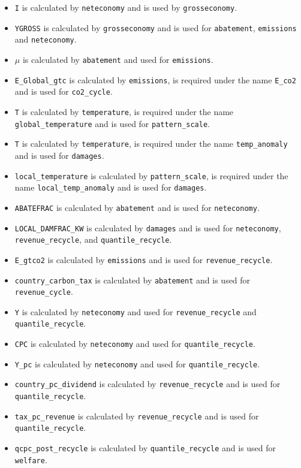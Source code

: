 \documentclass[
]{article}
\providecommand{\tightlist}{%
  \setlength{\itemsep}{0pt}\setlength{\parskip}{0pt}}
\begin{document}
\begin{itemize}
\tightlist
\item
  \texttt{I} is calculated by \texttt{neteconomy} and is used by
  \texttt{grosseconomy}.
\item
  \texttt{YGROSS} is calculated by \texttt{grosseconomy} and is used for
  \texttt{abatement}, \texttt{emissions} and \texttt{neteconomy}.
\item
  \(\mu\) is calculated by \texttt{abatement} and used for
  \texttt{emissions}.
\item
  \texttt{E\_Global\_gtc} is calculated by \texttt{emissions}, is
  required under the name \texttt{E\_co2} and is used for
  \texttt{co2\_cycle}.
\item
  \texttt{T} is calculated by \texttt{temperature}, is required under
  the name \texttt{global\_temperature} and is used for
  \texttt{pattern\_scale}.
\item
  \texttt{T} is calculated by \texttt{temperature}, is required under
  the name \texttt{temp\_anomaly} and is used for \texttt{damages}.
\item
  \texttt{local\_temperature} is calculated by \texttt{pattern\_scale},
  is required under the name \texttt{local\_temp\_anomaly} and is used
  for \texttt{damages}.
\item
  \texttt{ABATEFRAC} is calculated by \texttt{abatement} and is used for
  \texttt{neteconomy}.
\item
  \texttt{LOCAL\_DAMFRAC\_KW} is calculated by \texttt{damages} and is
  used for \texttt{neteconomy}, \texttt{revenue\_recycle}, and
  \texttt{quantile\_recycle}.
\item
  \texttt{E\_gtco2} is calculated by \texttt{emissions} and is used for
  \texttt{revenue\_recycle}.
\item
  \texttt{country\_carbon\_tax} is calculated by \texttt{abatement} and
  is used for \texttt{revenue\_cycle}.
\item
  \texttt{Y} is calculated by \texttt{neteconomy} and used for
  \texttt{revenue\_recycle} and \texttt{quantile\_recycle}.
\item
  \texttt{CPC} is calculated by \texttt{neteconomy} and used for
  \texttt{quantile\_recycle}.
  \item
  \texttt{Y\_pc} is calculated by \texttt{neteconomy} and used for
  \texttt{quantile\_recycle}.
\item
  \texttt{country\_pc\_dividend} is calculated by
  \texttt{revenue\_recycle} and is used for \texttt{quantile\_recycle}.
\item
  \texttt{tax\_pc\_revenue} is calculated by \texttt{revenue\_recycle}
  and is used for \texttt{quantile\_recycle}.
\item
  \texttt{qcpc\_post\_recycle} is calculated by \texttt{quantile\_recycle}
  and is used for \texttt{welfare}.
\end{itemize}
\end{document}
